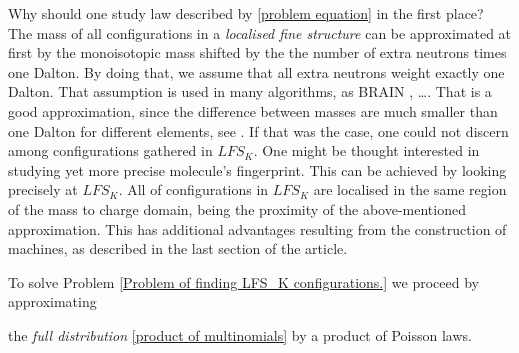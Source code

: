 Why should one study law described by \eqref{problem equation} in the first place? The mass of all configurations in a {\it localised fine structure} can be approximated at first by the monoisotopic mass shifted by the the number of extra neutrons times one Dalton. By doing that, we assume that all extra neutrons weight exactly one Dalton. That assumption is used in many algorithms, as \textsc{BRAIN} \cite{Claesen2012Efficient}, \dots{}. That is a good approximation, since the difference between masses are much smaller than one Dalton for different elements, see \cite{Hughey2001KendrickMassDefect}. If that was the case, one could not discern among configurations gathered in $LFS_K$. One might be thought interested in studying yet more precise molecule's fingerprint. This can be achieved by looking precisely at $LFS_K$. All of configurations in $LFS_K$ are localised in the same region of the mass to charge domain, being the proximity of the above-mentioned approximation. This has additional advantages resulting from the construction of machines, as described in the last section of the article.  



To solve Problem \ref{Problem of finding LFS_K configurations.} we proceed by approximating 

 the {\it full distribution} \eqref{product of multinomials} by a product of Poisson laws.
	

